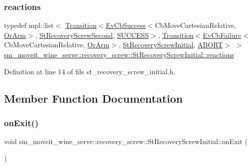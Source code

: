 \subsubsection{\texorpdfstring{reactions}{reactions}}
{\footnotesize\ttfamily typedef mpl\+::list$<$ \hyperlink{classsmacc_1_1Transition}{Transition}$<$\hyperlink{structsmacc_1_1EvCbSuccess}{Ev\+Cb\+Success}$<$Cb\+Move\+Cartesian\+Relative, \hyperlink{classsm__moveit__wine__serve_1_1OrArm}{Or\+Arm}$>$, \hyperlink{structsm__moveit__wine__serve_1_1recovery__screw_1_1StRecoveryScrewSecond}{St\+Recovery\+Screw\+Second}, \hyperlink{structsmacc_1_1default__transition__tags_1_1SUCCESS}{S\+U\+C\+C\+E\+SS}$>$, \hyperlink{classsmacc_1_1Transition}{Transition}$<$\hyperlink{structsmacc_1_1EvCbFailure}{Ev\+Cb\+Failure}$<$Cb\+Move\+Cartesian\+Relative, \hyperlink{classsm__moveit__wine__serve_1_1OrArm}{Or\+Arm}$>$, \hyperlink{structsm__moveit__wine__serve_1_1recovery__screw_1_1StRecoveryScrewInitial}{St\+Recovery\+Screw\+Initial}, \hyperlink{structsmacc_1_1default__transition__tags_1_1ABORT}{A\+B\+O\+RT}$>$ $>$ \hyperlink{structsm__moveit__wine__serve_1_1recovery__screw_1_1StRecoveryScrewInitial_a4eec45a22fd1b591bbcc7d0ac70cf886}{sm\+\_\+moveit\+\_\+wine\+\_\+serve\+::recovery\+\_\+screw\+::\+St\+Recovery\+Screw\+Initial\+::reactions}}



Definition at line 14 of file st\+\_\+recovery\+\_\+screw\+\_\+initial.\+h.



\subsection{Member Function Documentation}
\mbox{\label{structsm__moveit__wine__serve_1_1recovery__screw_1_1StRecoveryScrewInitial_a342404863dff6fae9411abd730796122}} 
\subsubsection{\texorpdfstring{on\+Exit()}{onExit()}}
{\footnotesize\ttfamily void sm\+\_\+moveit\+\_\+wine\+\_\+serve\+::recovery\+\_\+screw\+::\+St\+Recovery\+Screw\+Initial\+::on\+Exit (\begin{DoxyParamCaption}{ }\end{DoxyParamCaption})\hspace{0.3cm}{\ttfamily [inline]}}



